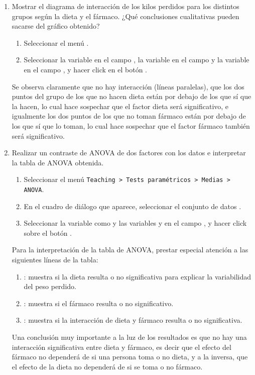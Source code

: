 \begin{enumerate}[leftmargin=*]
\begin{enumerate}
\item Mostrar el diagrama de interacción de los kilos perdidos para los distintos grupos según la dieta y el fármaco.
¿Qué conclusiones cualitativas pueden sacarse del gráfico obtenido? 
\begin{indicacion}
\begin{enumerate}
\item Seleccionar el menú .
\item Seleccionar la variable  en el campo , la variable
 en el campo  y la variable  en el campo , y hacer click en el botón .
\end{enumerate}
Se observa claramente que no hay interacción (líneas paralelas), que los dos puntos del grupo de los que no hacen dieta
están por debajo de los que sí que la hacen, lo cual hace sospechar que el factor dieta será significativo, e igualmente
los dos puntos de los que no toman fármaco están por debajo de los que sí que lo toman, lo cual hace sospechar que el
factor fármaco también será significativo.
\end{indicacion}  


\item Realizar un contraste de ANOVA de dos factores con los datos e interpretar la tabla de ANOVA obtenida.
\begin{indicacion}
\begin{enumerate}
\item Seleccionar el menú \texttt{Teaching > Tests paramétricos > Medias > ANOVA}.
\item En el cuadro de diálogo que aparece, seleccionar el conjunto de datos .
\item Seleccionar la variable  como  y las variables
 y  en el campo , y hacer click sobre el botón
.
\end{enumerate}

Para la interpretación de la tabla de ANOVA, prestar especial atención a las siguientes líneas de la tabla:
\begin{enumerate}
\item {}: muestra si la dieta resulta o no significativa para explicar la variabilidad del peso perdido.
\item {}: muestra si el fármaco resulta o no significativo.
\item {}: muestra si la interacción de dieta y fármaco resulta o no significativa.
\end{enumerate}
Una conclusión muy importante a la luz de los resultados es que no hay una interacción significativa entre dieta y
fármaco, es decir que el efecto del fármaco no dependerá de si una persona toma o no dieta, y a la inversa, que el
efecto de la dieta no dependerá de si se toma o no fármaco.
\end{indicacion}


\end{enumerate}
\end{enumerate}
